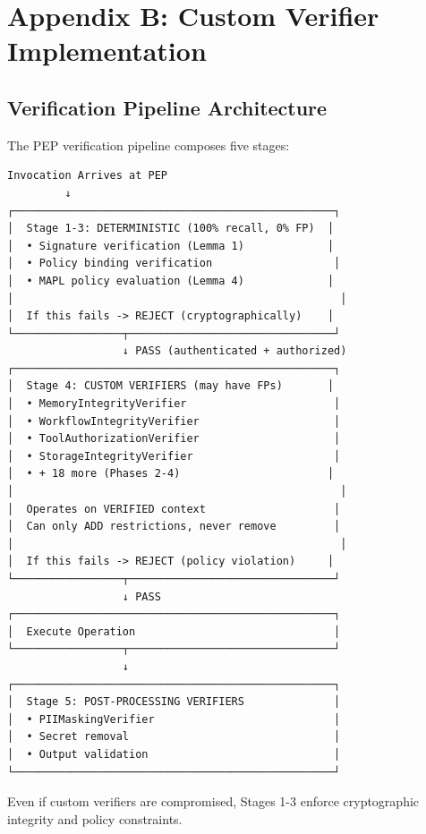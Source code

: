 \section*{Appendix B: Custom Verifier Implementation}
\label{appendix:verifiers}

\subsection*{Verification Pipeline Architecture}

{\tiny
The PEP verification pipeline composes five stages:

\begin{verbatim}
Invocation Arrives at PEP
         ↓
┌──────────────────────────────────────────────────┐
│  Stage 1-3: DETERMINISTIC (100% recall, 0% FP)  │
│  • Signature verification (Lemma 1)             │
│  • Policy binding verification                   │
│  • MAPL policy evaluation (Lemma 4)             │
│                                                   │
│  If this fails -> REJECT (cryptographically)    │
└─────────────────┬────────────────────────────────┘
                  ↓ PASS (authenticated + authorized)
┌──────────────────────────────────────────────────┐
│  Stage 4: CUSTOM VERIFIERS (may have FPs)       │
│  • MemoryIntegrityVerifier                       │
│  • WorkflowIntegrityVerifier                     │
│  • ToolAuthorizationVerifier                     │
│  • StorageIntegrityVerifier                      │
│  • + 18 more (Phases 2-4)                       │
│                                                   │
│  Operates on VERIFIED context                    │
│  Can only ADD restrictions, never remove         │
│                                                   │
│  If this fails -> REJECT (policy violation)     │
└─────────────────┬────────────────────────────────┘
                  ↓ PASS
┌──────────────────────────────────────────────────┐
│  Execute Operation                               │
└─────────────────┬────────────────────────────────┘
                  ↓
┌──────────────────────────────────────────────────┐
│  Stage 5: POST-PROCESSING VERIFIERS              │
│  • PIIMaskingVerifier                            │
│  • Secret removal                                │
│  • Output validation                             │
└──────────────────────────────────────────────────┘
\end{verbatim}

Even if custom verifiers are compromised, Stages 1-3 enforce cryptographic integrity and policy constraints.
}


